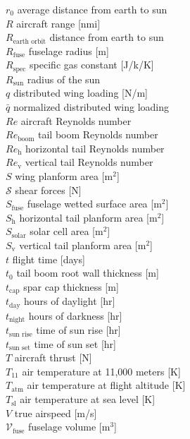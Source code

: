 \documentclass[]{aiaa-tc}%
\begin{document}
\begin{multicols}{2}
\begin{tabbing}
$r_0$ \> average distance from earth to sun \\
$R$ \> aircraft range [nmi] \\
$R_{\text{earth orbit}}$ \> distance from earth to sun \\
$R_{\text{fuse}}$ \> fuselage radius [m] \\
$R_{\text{spec}}$ \> specific gas constant [J/k/K] \\
$R_{\text{sun}}$ \> radius of the sun \\
$q$ \> distributed wing loading [N/m] \\
$\bar{q}$ \> normalized distributed wing loading \\
$Re$ \> aircraft Reynolds number \\
$Re_{\text{boom}}$ \> tail boom Reynolds number \\
$Re_{\text{h}}$ \> horizontal tail Reynolds number \\
$Re_{\text{v}}$ \> vertical tail Reynolds number \\
$S$ \> wing planform area [m$^2$]\\
$\mathcal{S}$ \> shear forces [N] \\
$S_{\text{fuse}}$ \> fuselage wetted surface area [m$^2$]\\
$S_{\text{h}}$ \> horizontal tail planform area [m$^2$]\\
$S_{\text{solar}}$ \> solar cell area [m$^2$]\\
$S_{\text{v}}$ \> vertical tail planform area [m$^2$]\\
$t$ \> flight time [days] \\
$t_0$ \> tail boom root wall thickness [m] \\
$t_{\text{cap}}$ \> spar cap thickness [m] \\
$t_{\text{day}}$ \> hours of daylight [hr] \\
$t_{\text{night}}$ \> hours of darkness [hr] \\
$t_{\text{sun rise}}$ \> time of sun rise [hr] \\
$t_{\text{sun set}}$ \> time of sun set [hr] \\
$T$ \> aircraft thrust [N] \\
$T_{11}$ \> air temperature at 11,000 meters [K] \\
$T_{\text{atm}}$ \> air temperature at flight altitude [K] \\
$T_{\text{sl}}$ \> air temperature at sea level [K] \\
$V$ \> true airspeed [m/s] \\
$\mathcal{V}_{\text{fuse}}$ \>  fuselage volume [m$^3$] \\

\end{tabbing}
\end{multicols}
\end{document}
